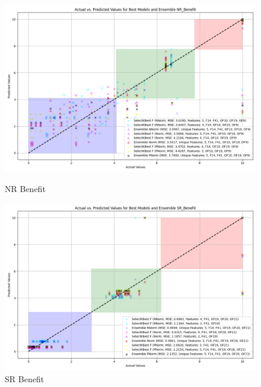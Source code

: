 \begin{figure}[H]
    \centering
    \begin{minipage}{0.45\textwidth}
        \centering
        \includegraphics[width=\linewidth]{reg_section_all/featred_ensemble_learning/actual_vs_predicted_best_feature_selection_and_ensemble_NR_Benefit_10.png}
        \caption{NR Benefit}
        \label{reg_all_fig:nr_ben_featred}
    \end{minipage}\hfill
    \begin{minipage}{0.45\textwidth}
        \centering
        \includegraphics[width=\linewidth]{reg_section_all/featred_ensemble_learning/actual_vs_predicted_best_feature_selection_and_ensemble_SR_Benefit_10.png}
        \caption{SR Benefit}
        \label{reg_all_fig:sr_ben_featred}
    \end{minipage}
\end{figure}

